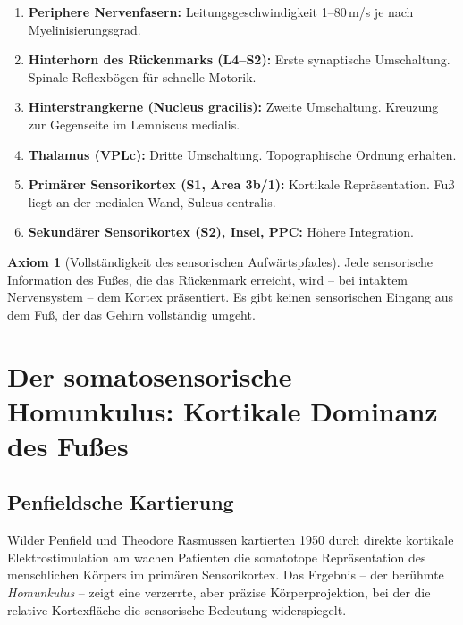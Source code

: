 ﻿\documentclass[12pt,a4paper]{report}
\theoremstyle{plain}
\theoremstyle{definition}
\newtheorem{axiom}[theorem]{Axiom}
\theoremstyle{remark}
\begin{document}
\begin{enumerate}
\item \textbf{Periphere Nervenfasern:} Leitungsgeschwindigkeit 1--80\,m/s
  je nach Myelinisierungsgrad.
\item \textbf{Hinterhorn des Rückenmarks (L4--S2):} Erste synaptische
  Umschaltung. Spinale Reflexbögen für schnelle Motorik.
\item \textbf{Hinterstrangkerne (Nucleus gracilis):} Zweite Umschaltung.
  Kreuzung zur Gegenseite im Lemniscus medialis.
\item \textbf{Thalamus (VPLc):} Dritte Umschaltung.
  Topographische Ordnung erhalten.
\item \textbf{Primärer Sensorikortex (S1, Area 3b/1):} Kortikale Repräsentation.
  Fuß liegt an der medialen Wand, Sulcus centralis.
\item \textbf{Sekundärer Sensorikortex (S2), Insel, PPC:} Höhere Integration.
\end{enumerate}

\begin{axiom}[Vollständigkeit des sensorischen Aufwärtspfades]
Jede sensorische Information des Fußes, die das Rückenmark erreicht, wird
-- bei intaktem Nervensystem -- dem Kortex präsentiert. Es gibt keinen
sensorischen Eingang aus dem Fuß, der das Gehirn vollständig umgeht.
\end{axiom}

\chapter{Der somatosensorische Homunkulus: Kortikale Dominanz des Fußes}

\section{Penfieldsche Kartierung}

Wilder Penfield und Theodore Rasmussen kartierten 1950 durch direkte
kortikale Elektrostimulation am wachen Patienten die somatotope Repräsentation
des menschlichen Körpers im primären Sensorikortex. Das Ergebnis -- der
berühmte \emph{Homunkulus} -- zeigt eine verzerrte, aber präzise
Körperprojektion, bei der die relative Kortexfläche die sensorische
Bedeutung widerspiegelt.
\end{document}
